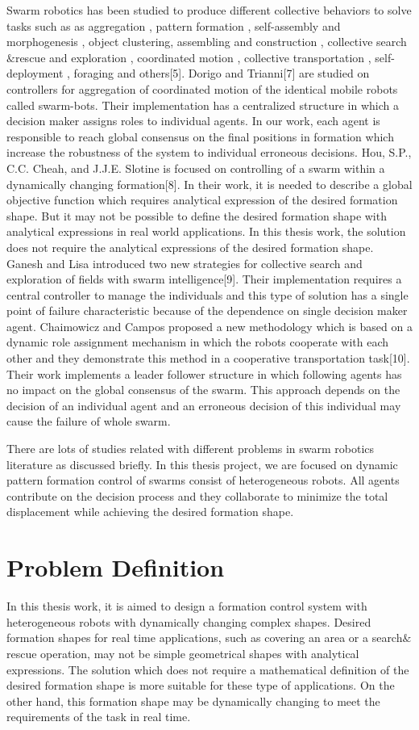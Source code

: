 Swarm robotics has been studied to produce different collective behaviors to solve tasks such as as aggregation , pattern formation , self-assembly and morphogenesis , object clustering, assembling and construction , collective search$\&$rescue and exploration , coordinated motion , collective transportation , self-deployment , foraging and others[5]. Dorigo and Trianni[7] are studied on controllers for aggregation of coordinated motion of the identical mobile robots called swarm-bots. Their implementation has a centralized structure in which a decision maker assigns roles to individual agents. In our work, each agent is responsible to reach global consensus on the final positions in formation which increase the robustness of the system to individual erroneous decisions. Hou, S.P., C.C. Cheah, and J.J.E. Slotine is focused on controlling of a swarm within a dynamically changing formation[8]. In their work, it is needed to describe a global objective function which requires analytical expression of the desired formation shape. But it may not be possible to define the desired formation shape with analytical expressions in real world applications. In this thesis work, the solution does not require the analytical expressions of the desired formation shape.  Ganesh and Lisa introduced two new strategies for collective search and exploration of fields with swarm intelligence[9]. Their implementation requires a central controller to manage the individuals and this type of solution has a single point of failure characteristic because of the dependence on single decision maker agent.   Chaimowicz and Campos proposed a new methodology which is based on a dynamic role assignment mechanism in which the robots cooperate with each other and they demonstrate this method in a cooperative transportation task[10]. Their work implements a leader follower structure in which following agents has no impact on the global consensus of the swarm. This approach depends on the decision of an individual agent and an erroneous decision of this individual may cause the failure of whole swarm. 

There are lots of studies related with different problems in swarm robotics literature as discussed briefly. In this thesis project, we are focused on dynamic pattern formation control of swarms consist of heterogeneous robots. All agents contribute on the decision process and they collaborate to minimize the total displacement while achieving the desired formation shape. 

\section{Problem Definition}
In this thesis work, it is aimed to design a formation control system with heterogeneous robots with dynamically changing complex shapes. Desired formation shapes for real time applications, such as covering an area or a search$\&$rescue operation, may not be simple geometrical shapes with analytical expressions. The solution which does not require a mathematical definition of the desired formation shape is more suitable for these type of applications. On the other hand, this formation shape may be dynamically changing to meet the requirements of the task in real time. 

